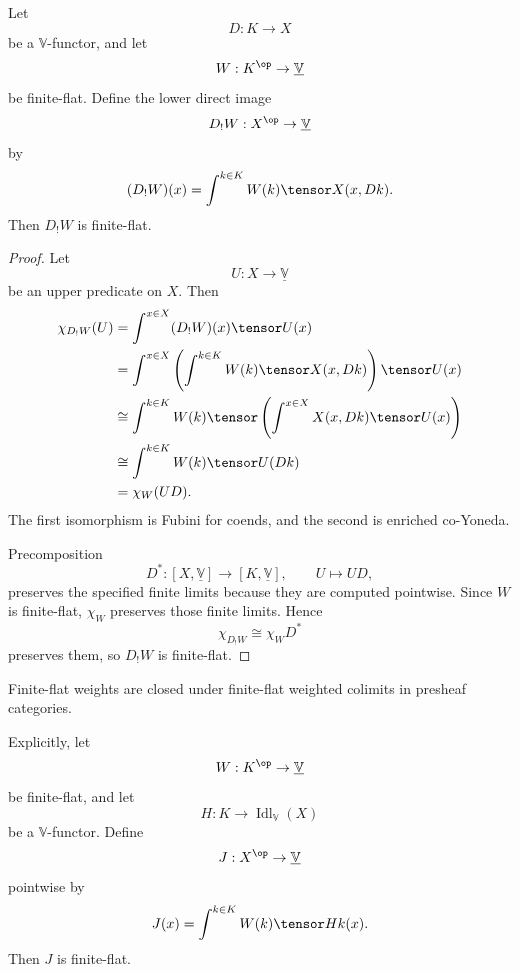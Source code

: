 \begin{lemma}
\label{lem:finite-flat-direct-images-fdom}
Let
\[
    D:K\to X
\]
be a \(\mathbb V\)-functor, and let
\[
    W:K^{\op}\to\underline{\mathbb V}
\]
be finite-flat.  Define the lower direct image
\[
    D_!W:X^{\op}\to\underline{\mathbb V}
\]
by
\[
    (D_!W)(x)
    =
    \int^{k\in K}W(k)\tensor X(x,Dk).
\]
Then \(D_!W\) is finite-flat.
\end{lemma}

\begin{proof}
Let
\[
    U:X\to\underline{\mathbb V}
\]
be an upper predicate on \(X\).  Then
\[
\begin{aligned}
    \chi_{D_!W}(U)
    &=
    \int^{x\in X}(D_!W)(x)\tensor U(x)
    \\
    &=
    \int^{x\in X}
        \left(
            \int^{k\in K}W(k)\tensor X(x,Dk)
        \right)\tensor U(x)
    \\
    &\cong
    \int^{k\in K}
        W(k)\tensor
        \left(
            \int^{x\in X}X(x,Dk)\tensor U(x)
        \right)
    \\
    &\cong
    \int^{k\in K}W(k)\tensor U(Dk)
    \\
    &=
    \chi_W(UD).
\end{aligned}
\]
The first isomorphism is Fubini for coends, and the second is enriched
co-Yoneda.

Precomposition
\[
    D^*:[X,\underline{\mathbb V}]\to[K,\underline{\mathbb V}],
    \qquad
    U\longmapsto UD,
\]
preserves the specified finite limits because they are computed pointwise.
Since \(W\) is finite-flat, \(\chi_W\) preserves those finite limits.  Hence
\[
    \chi_{D_!W}\cong \chi_WD^*
\]
preserves them, so \(D_!W\) is finite-flat.
\end{proof}

\begin{proposition}
\label{prop:finite-flat-saturation-fdom}
Finite-flat weights are closed under finite-flat weighted colimits in presheaf
categories.

Explicitly, let
\[
    W:K^{\op}\to\underline{\mathbb V}
\]
be finite-flat, and let
\[
    H:K\to\operatorname{Idl}_{\mathbb V}(X)
\]
be a \(\mathbb V\)-functor.  Define
\[
    J:X^{\op}\to\underline{\mathbb V}
\]
pointwise by
\[
    J(x)
    =
    \int^{k\in K}W(k)\tensor Hk(x).
\]
Then \(J\) is finite-flat.
\end{proposition}

